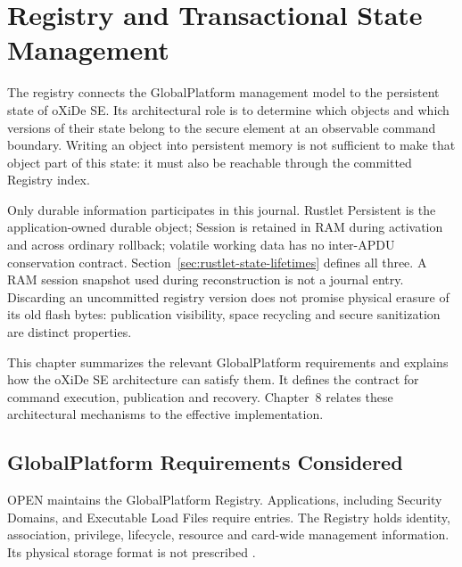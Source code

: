 \chapter{Registry and Transactional State Management}
\label{chap:registry-persistence}

The registry connects the GlobalPlatform management model to the persistent
state of oXiDe SE. Its architectural role is to determine which objects and
which versions of their state belong to the secure element at an observable
command boundary. Writing an object into persistent memory is not sufficient
to make that object part of this state: it must also be reachable through the
committed Registry index.

Only durable information participates in this journal. Rustlet Persistent
is the application-owned durable object; Session is retained in RAM during
activation and across ordinary rollback; volatile working data has no
inter-APDU conservation contract. Section~\ref{sec:rustlet-state-lifetimes}
defines all three. A RAM session snapshot used during reconstruction is not
a journal entry. Discarding an uncommitted registry version does not promise
physical erasure of its old flash bytes: publication visibility, space
recycling and secure sanitization are distinct properties.

This chapter summarizes the relevant GlobalPlatform requirements and explains
how the oXiDe SE architecture can satisfy them. It defines the contract for
command execution, publication and recovery. Chapter~8 relates these
architectural mechanisms to the effective implementation.

\section{GlobalPlatform Requirements Considered}
\label{sec:gp-registry-transaction-requirements}

OPEN maintains the GlobalPlatform Registry. Applications, including Security
Domains, and Executable Load Files require entries. The Registry holds
identity, association, privilege, lifecycle, resource and card-wide management
information. Its physical storage format is not prescribed
.

